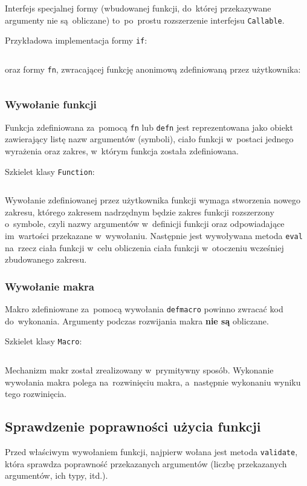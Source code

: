 \documentclass[a4paper,11pt]{article}
\newcommand{\impl}[1]{
\inputminted[fontsize=\footnotesize,frame=single,samepage=true]{java}{impl/#1.java}
}
\begin{document}
Interfejs specjalnej formy (wbudowanej funkcji, do~której przekazywane
argumenty nie są~obliczane) to~po~prostu rozszerzenie interfejsu
\verb+Callable+.

Przykładowa implementacja formy \verb+if+:
\impl{IfForm}
oraz formy \verb+fn+, zwracającej funkcję anonimową zdefiniowaną przez
użytkownika:
\impl{FnForm}

\subsubsection{Wywołanie funkcji}

Funkcja zdefiniowana za~pomocą \verb+fn+ lub \verb+defn+ jest reprezentowana
jako obiekt zawierający listę nazw argumentów (symboli), ciało funkcji
w~postaci jednego wyrażenia oraz zakres, w~którym funkcja została zdefiniowana.

Szkielet klasy \verb+Function+:
\impl{Function}

Wywołanie zdefiniowanej przez użytkownika funkcji wymaga stworzenia nowego
zakresu, którego zakresem nadrzędnym będzie zakres funkcji rozszerzony
o~symbole, czyli nazwy argumentów w~definicji funkcji oraz odpowiadające
im~wartości przekazane w~wywołaniu. Następnie jest wywoływana metoda
\verb+eval+ na~rzecz ciała funkcji w~celu obliczenia ciała funkcji w~otoczeniu
wcześniej zbudowanego zakresu.

\subsubsection{Wywołanie makra}

Makro zdefiniowane za~pomocą wywołania \verb+defmacro+ powinno zwracać kod
do~wykonania. Argumenty podczas rozwijania makra \textbf{nie są} obliczane.

Szkielet klasy \verb+Macro+:
\impl{Macro}

Mechanizm makr został zrealizowany w~prymitywny sposób. Wykonanie wywołania
makra polega na~rozwinięciu makra, a~następnie wykonaniu wyniku tego
rozwinięcia.

\subsection{Sprawdzenie poprawności użycia funkcji}

Przed właściwym wywołaniem funkcji, najpierw wołana jest metoda
\verb+validate+, która sprawdza poprawność przekazanych argumentów (liczbę
przekazanych argumentów, ich typy, itd.).
\end{document}
